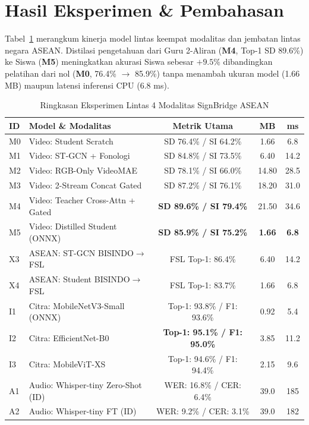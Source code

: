 \documentclass[conference]{IEEEtran}
\begin{document}
\section{Hasil Eksperimen \& Pembahasan}
Tabel~\ref{tab:summary} merangkum kinerja model lintas keempat modalitas dan jembatan lintas negara ASEAN. Distilasi pengetahuan dari Guru 2-Aliran (\textbf{M4}, Top-1 SD 89.6\%) ke Siswa (\textbf{M5}) meningkatkan akurasi Siswa sebesar $+9.5\%$ dibandingkan pelatihan dari nol (\textbf{M0}, 76.4\% $\rightarrow$ 85.9\%) tanpa menambah ukuran model (1.66 MB) maupun latensi inferensi CPU (6.8 ms).

\begin{table}[htbp]
\caption{Ringkasan Eksperimen Lintas 4 Modalitas SignBridge ASEAN}
\label{tab:summary}
\centering
\scriptsize
\begin{tabular}{llccc}
\toprule
\textbf{ID} & \textbf{Model \& Modalitas} & \textbf{Metrik Utama} & \textbf{MB} & \textbf{ms} \\
\midrule
M0 & Video: Student Scratch & SD 76.4\% / SI 64.2\% & 1.66 & 6.8 \\
M1 & Video: ST-GCN + Fonologi & SD 84.8\% / SI 73.5\% & 6.40 & 14.2 \\
M2 & Video: RGB-Only VideoMAE & SD 78.1\% / SI 66.0\% & 14.80 & 28.5 \\
M3 & Video: 2-Stream Concat Gated & SD 87.2\% / SI 76.1\% & 18.20 & 31.0 \\
M4 & Video: Teacher Cross-Attn + Gated & \textbf{SD 89.6\% / SI 79.4\%} & 21.50 & 34.6 \\
M5 & Video: Distilled Student (ONNX) & \textbf{SD 85.9\% / SI 75.2\%} & \textbf{1.66} & \textbf{6.8} \\
X3 & ASEAN: ST-GCN BISINDO$\rightarrow$FSL & FSL Top-1: 86.4\% & 6.40 & 14.2 \\
X4 & ASEAN: Student BISINDO$\rightarrow$FSL & FSL Top-1: 83.7\% & 1.66 & 6.8 \\
\midrule
I1 & Citra: MobileNetV3-Small (ONNX) & Top-1: 93.8\% / F1: 93.6\% & 0.92 & 5.4 \\
I2 & Citra: EfficientNet-B0 & \textbf{Top-1: 95.1\% / F1: 95.0\%} & 3.85 & 11.2 \\
I3 & Citra: MobileViT-XS & Top-1: 94.6\% / F1: 94.4\% & 2.15 & 9.6 \\
\midrule
A1 & Audio: Whisper-tiny Zero-Shot (ID) & WER: 16.8\% / CER: 6.4\% & 39.0 & 185 \\
A2 & Audio: Whisper-tiny FT (ID) & WER: 9.2\% / CER: 3.1\% & 39.0 & 182 \\

\end{tabular}
\end{table}
\end{document}
